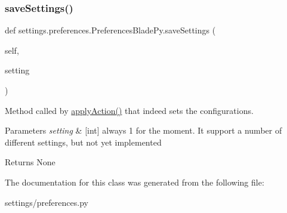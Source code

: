 \subsubsection{\texorpdfstring{save\+Settings()}{saveSettings()}}
{\footnotesize\ttfamily def settings.\+preferences.\+Preferences\+Blade\+Py.\+save\+Settings (\begin{DoxyParamCaption}\item[{}]{self,  }\item[{}]{setting }\end{DoxyParamCaption})}



Method called by \hyperlink{a00109_a8938a7b43ca7c5496a0ae7bf8d6a0c54}{apply\+Action()} that indeed sets the configurations. 


\begin{DoxyParams}{Parameters}
{\em setting} & \mbox{[}int\mbox{]} always 1 for the moment. It support a number of different settings, but not yet implemented \\
\hline
\end{DoxyParams}
\begin{DoxyReturn}{Returns}
None 
\end{DoxyReturn}


The documentation for this class was generated from the following file\+:\begin{DoxyCompactItemize}
\item 
settings/preferences.\+py\end{DoxyCompactItemize}
